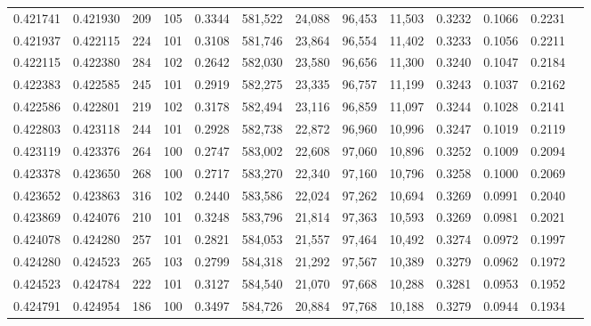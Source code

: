 \begin{tabular}{rrrrrrrrrrrrr}
0.421741 & 0.421930 &   209 & 105 &                                     0.3344 & 581,522 &  24,088 &  96,453 &  11,503 & 0.3232 & 0.1066 & 0.2231 \\
0.421937 & 0.422115 &   224 & 101 &                                     0.3108 & 581,746 &  23,864 &  96,554 &  11,402 & 0.3233 & 0.1056 & 0.2211 \\
0.422115 & 0.422380 &   284 & 102 &                                     0.2642 & 582,030 &  23,580 &  96,656 &  11,300 & 0.3240 & 0.1047 & 0.2184 \\
0.422383 & 0.422585 &   245 & 101 &                                     0.2919 & 582,275 &  23,335 &  96,757 &  11,199 & 0.3243 & 0.1037 & 0.2162 \\
0.422586 & 0.422801 &   219 & 102 &                                     0.3178 & 582,494 &  23,116 &  96,859 &  11,097 & 0.3244 & 0.1028 & 0.2141 \\
0.422803 & 0.423118 &   244 & 101 &                                     0.2928 & 582,738 &  22,872 &  96,960 &  10,996 & 0.3247 & 0.1019 & 0.2119 \\
0.423119 & 0.423376 &   264 & 100 &                                     0.2747 & 583,002 &  22,608 &  97,060 &  10,896 & 0.3252 & 0.1009 & 0.2094 \\
0.423378 & 0.423650 &   268 & 100 &                                     0.2717 & 583,270 &  22,340 &  97,160 &  10,796 & 0.3258 & 0.1000 & 0.2069 \\
0.423652 & 0.423863 &   316 & 102 &                                     0.2440 & 583,586 &  22,024 &  97,262 &  10,694 & 0.3269 & 0.0991 & 0.2040 \\
0.423869 & 0.424076 &   210 & 101 &                                     0.3248 & 583,796 &  21,814 &  97,363 &  10,593 & 0.3269 & 0.0981 & 0.2021 \\
0.424078 & 0.424280 &   257 & 101 &                                     0.2821 & 584,053 &  21,557 &  97,464 &  10,492 & 0.3274 & 0.0972 & 0.1997 \\
0.424280 & 0.424523 &   265 & 103 &                                     0.2799 & 584,318 &  21,292 &  97,567 &  10,389 & 0.3279 & 0.0962 & 0.1972 \\
0.424523 & 0.424784 &   222 & 101 &                                     0.3127 & 584,540 &  21,070 &  97,668 &  10,288 & 0.3281 & 0.0953 & 0.1952 \\
0.424791 & 0.424954 &   186 & 100 &                                     0.3497 & 584,726 &  20,884 &  97,768 &  10,188 & 0.3279 & 0.0944 & 0.1934 \\

\end{tabular}
